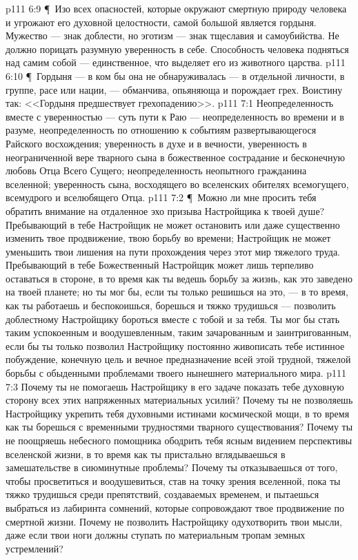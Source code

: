 \vs p111 6:9 \P\ Изо всех опасностей, которые окружают смертную природу человека и угрожают его духовной целостности, самой большой является гордыня. Мужество --- знак доблести, но эготизм --- знак тщеславия и самоубийства. Не должно порицать разумную уверенность в себе. Способность человека подняться над самим собой --- единственное, что выделяет его из животного царства.
\vs p111 6:10 \P\ Гордыня --- в ком бы она не обнаруживалась --- в отдельной личности, в группе, расе или нации, --- обманчива, опьяняюща и порождает грех. Воистину так: <<Гордыня предшествует грехопадению>>.
\vs p111 7:1 Неопределенность вместе с уверенностью --- суть пути к Раю --- неопределенность во времени и в разуме, неопределенность по отношению к событиям развертывающегося Райского восхождения; уверенность в духе и в вечности, уверенность в неограниченной вере тварного сына в божественное сострадание и бесконечную любовь Отца Всего Сущего; неопределенность неопытного гражданина вселенной; уверенность сына, восходящего во вселенских обителях всемогущего, всемудрого и вселюбящего Отца.
\vs p111 7:2 \P\ Можно ли мне просить тебя обратить внимание на отдаленное эхо призыва Настройщика к твоей душе? Пребывающий в тебе Настройщик не может остановить или даже существенно изменить твое продвижение, твою борьбу во времени; Настройщик не может уменьшить твои лишения на пути прохождения через этот мир тяжелого труда. Пребывающий в тебе Божественный Настройщик может лишь терпеливо оставаться в стороне, в то время как ты ведешь борьбу за жизнь, как это заведено на твоей планете; но ты мог бы, если ты только решишься на это, --- в то время, как ты работаешь и беспокоишься, борешься и тяжко трудишься --- позволить доблестному Настройщику бороться вместе с тобой и за тебя. Ты мог бы стать таким успокоенным и воодушевленным, таким зачарованным и заинтригованным, если бы ты только позволил Настройщику постоянно живописать тебе истинное побуждение, конечную цель и вечное предназначение всей этой трудной, тяжелой борьбы с обыденными проблемами твоего нынешнего материального мира.
\vs p111 7:3 Почему ты не помогаешь Настройщику в его задаче показать тебе духовную сторону всех этих напряженных материальных усилий? Почему ты не позволяешь Настройщику укрепить тебя духовными истинами космической мощи, в то время как ты борешься с временными трудностями тварного существования? Почему ты не поощряешь небесного помощника ободрить тебя ясным видением перспективы вселенской жизни, в то время как ты пристально вглядываешься в замешательстве в сиюминутные проблемы? Почему ты отказываешься от того, чтобы просветиться и воодушевиться, став на точку зрения вселенной, пока ты тяжко трудишься среди препятствий, создаваемых временем, и пытаешься выбраться из лабиринта сомнений, которые сопровождают твое продвижение по смертной жизни. Почему не позволить Настройщику одухотворить твои мысли, даже если твои ноги должны ступать по материальным тропам земных устремлений?
